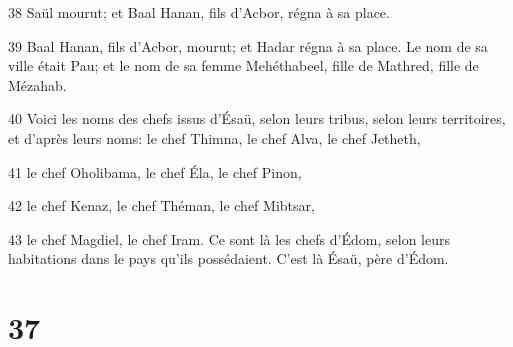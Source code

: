 \par 38 Saül mourut; et Baal Hanan, fils d'Acbor, régna à sa place.
\par 39 Baal Hanan, fils d'Acbor, mourut; et Hadar régna à sa place. Le nom de sa ville était Pau; et le nom de sa femme Mehéthabeel, fille de Mathred, fille de Mézahab.
\par 40 Voici les noms des chefs issus d'Ésaü, selon leurs tribus, selon leurs territoires, et d'après leurs noms: le chef Thimna, le chef Alva, le chef Jetheth,
\par 41 le chef Oholibama, le chef Éla, le chef Pinon,
\par 42 le chef Kenaz, le chef Théman, le chef Mibtsar,
\par 43 le chef Magdiel, le chef Iram. Ce sont là les chefs d'Édom, selon leurs habitations dans le pays qu'ils possédaient. C'est là Ésaü, père d'Édom.

\chapter{37}


